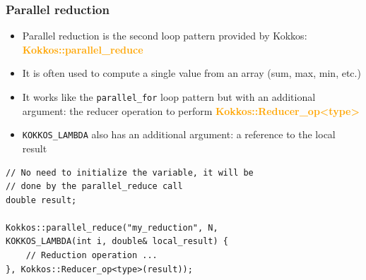 \documentclass[aspectratio=169]{beamer}
\newcommand{\highlight}[1]{\textcolor{orange}{\textbf{#1}}}
\begin{document}

\begin{frame}[fragile]
    \frametitle{Parallel reduction}

\begin{itemize}
\item Parallel reduction is the second loop pattern provided by Kokkos: \highlight{Kokkos::parallel\_reduce}
\item It is often used to compute a single value from an array (sum, max, min, etc.)
\item It works like the \texttt{parallel\_for} loop pattern but with an additional argument: the reducer operation to perform \highlight{Kokkos::Reducer\_op<type>}
\item \texttt{KOKKOS\_LAMBDA} also has an additional argument: a reference to the local result
\end{itemize}

\footnotesize
\begin{verbatim}
// No need to initialize the variable, it will be
// done by the parallel_reduce call
double result;

Kokkos::parallel_reduce("my_reduction", N,
KOKKOS_LAMBDA(int i, double& local_result) {
    // Reduction operation ...
}, Kokkos::Reducer_op<type>(result));
\end{verbatim}

\end{frame}

\end{document}
